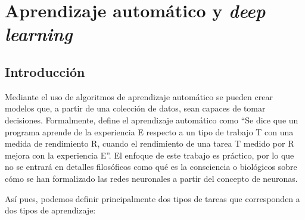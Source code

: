 \chapter{Aprendizaje automático y \textit{deep learning}}
\label{Chapter3}



\section{Introducción}
\label{sec:introducción-aprendizaje}

Mediante el uso de algoritmos de aprendizaje automático se pueden crear modelos que, a partir de una colección de datos, sean capaces de tomar decisiones. Formalmente, \cite{mitchell1997machine} define el aprendizaje automático como
``Se dice que un programa aprende de la experiencia E respecto a un tipo de trabajo T con una medida de rendimiento R, cuando el rendimiento de una tarea T medido por R mejora con la experiencia E''. El enfoque de este trabajo es práctico, por lo que no se entrará en detalles filosóficos como qué es la consciencia o biológicos sobre cómo se han formalizado las redes neuronales a partir del concepto de neuronas.

Así pues, podemos definir principalmente dos tipos de tareas que corresponden a dos tipos de aprendizaje:

